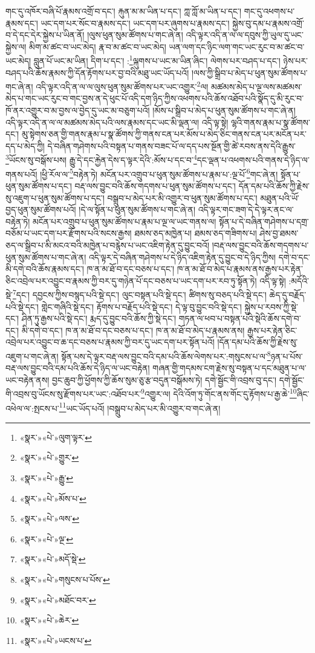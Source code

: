 གང་དུ་འཁོར་བཞི་པོ་རྣམས་འགྲོ་བ་དང་། རྐུན་མ་མ་ཡིན་པ་དང་། ཀླ་ཀློ་མ་ཡིན་པ་དང་། གང་དུ་འཕགས་པ་རྣམས་དང་། ཡང་དག་པར་སོང་བ་རྣམས་དང་། ཡང་དག་པར་ཞུགས་པ་རྣམས་དང་། སྐྱེས་བུ་དམ་པ་རྣམས་འགྲོ་བ་དེ་དང་དེར་སྐྱེས་པ་ཡིན་ནོ། །ལུས་ཕུན་སུམ་ཚོགས་པ་གང་ཞེ་ན། འདི་ལྟར་འདི་ན་ལ་ལ་དབུས་ཀྱི་ཡུལ་དུ་ཡང་སྐྱེས་ལ། མིག་མ་ཚང་བ་ཡང་མེད། རྣ་བ་མ་ཚང་བ་ཡང་མེད། ཡན་ལག་དང་ཉིང་ལག་གང་ཡང་རུང་བ་མ་ཚང་བ་ཡང་མེད། བླུན་པོ་ཡང་མ་ཡིན། དིག་པ་དང་། :\footnote{«སྣར་»«པེ་»ལུག་ལྟར་}ལྐུགས་པ་ཡང་མ་ཡིན་ཞིང་། ལེགས་པར་བཤད་པ་དང་། ཉེས་པར་བཤད་པའི་ཆོས་རྣམས་ཀྱི་དོན་རྟོགས་པར་བྱ་བའི་མཐུ་ཡང་ཡོད་པའོ། །ལས་ཀྱི་སྒྲིབ་པ་མེད་པ་ཕུན་སུམ་ཚོགས་པ་གང་ཞེ་ན། འདི་ལྟར་འདི་ན་ལ་ལ་ལུས་ཕུན་སུམ་ཚོགས་པར་ཡང་འགྱུར་\footnote{«སྣར་»«པེ་»གྱུར་}ལ། མཚམས་མེད་པ་ལྔ་ལས་མཚམས་མེད་པ་གང་ཡང་རུང་བ་གང་བྱས་ན་དེ་ཕུང་པོ་འདི་དག་ཉིད་ཀྱིས་འཕགས་པའི་ཆོས་འཐོབ་པའི་སྣོད་དུ་མི་རུང་བ་ཁོ་ནར་འགྱུར་བ་མ་བྱས་ལ་བྱེད་དུ་ཡང་མ་བཅུག་པའོ། །མོས་པ་སྒྲིབ་པ་མེད་པ་ཕུན་སུམ་ཚོགས་པ་གང་ཞེ་ན། འདི་ལྟར་འདི་ན་ལ་ལ་མཚམས་མེད་པའི་ལས་རྣམས་དང་ཡང་མི་ལྡན་ལ། འདི་ལྟ་སྟེ། ལྷའི་གནས་རྣམ་པ་སྣ་ཚོགས་དང་། མུ་སྟེགས་ཅན་གྱི་གནས་རྣམ་པ་སྣ་ཚོགས་ཀྱི་གནས་ངན་པར་མོས་པ་མེད་ཅིང་གནས་ངན་པར་མངོན་པར་དད་པ་མེད་ཀྱི། དེ་བཞིན་གཤེགས་པའི་བསྟན་པ་གནས་བཟང་པོ་ལ་དད་པས་སྔོན་གྱི་ཚེ་རབས་ནས་དེའི་རྒྱུས་\footnote{«སྣར་»«པེ་»རྒྱུ་}ཡོངས་སུ་བསྒོས་པས། རྒྱུ་དེ་དང་རྐྱེན་དེས་ད་ལྟར་དེའི་:མོས་པ་དང་བ་\footnote{«སྣར་»«པེ་»མོས་པ་}དང་ལྡན་པ་འཕགས་པའི་གནས་དེ་ཉིད་ལ་གནས་པའོ། །ཕྱི་རོལ་ལ་\footnote{«སྣར་»«པེ་»ལས་}བརྟེན་ཏེ། མངོན་པར་འགྲུབ་པ་ཕུན་སུམ་ཚོགས་པ་རྣམ་པ་:ལྔ་པོ་\footnote{«སྣར་»«པེ་»ལྔ་}གང་ཞེ་ན། སྟོན་པ་ཕུན་སུམ་ཚོགས་པ་དང་། བརྡ་ལས་བྱུང་བའི་ཆོས་གདགས་པ་ཕུན་སུམ་ཚོགས་པ་དང་། དོན་དམ་པའི་ཆོས་ཀྱི་རྗེས་སུ་འཇུག་པ་ཕུན་སུམ་ཚོགས་པ་དང་། བསྒྲུབ་པ་མེད་པར་མི་འགྱུར་བ་ཕུན་སུམ་ཚོགས་པ་དང་། མཐུན་པའི་ཡོ་བྱད་ཕུན་སུམ་ཚོགས་པའོ། །དེ་ལ་སྟོན་པ་ཕུན་སུམ་ཚོགས་པ་གང་ཞེ་ན། འདི་ལྟར་གང་ཟག་དེ་དེ་ལྟར་ནང་ལ་བརྟེན་ཏེ། མངོན་པར་འགྲུབ་པ་ཕུན་སུམ་ཚོགས་པ་རྣམ་པ་ལྔ་ལ་ཡང་གནས་ལ། སྟོན་པ་དེ་བཞིན་གཤེགས་པ་དགྲ་བཅོམ་པ་ཡང་དག་པར་རྫོགས་པའི་སངས་རྒྱས། ཐམས་ཅད་མཁྱེན་པ། ཐམས་ཅད་གཟིགས་པ། ཤེས་བྱ་ཐམས་ཅད་ལ་སྒྲིབ་པ་མི་མངའ་བའི་མཁྱེན་པ་བརྙེས་པ་ཡང་འཇིག་རྟེན་དུ་བྱུང་བའོ། །བརྡ་ལས་བྱུང་བའི་ཆོས་གདགས་པ་ཕུན་སུམ་ཚོགས་པ་གང་ཞེ་ན། འདི་ལྟར་དེ་བཞིན་གཤེགས་པ་དེ་ཉིད་འཇིག་རྟེན་དུ་བྱུང་བ་དེ་ཉིད་ཀྱིས། དགེ་བ་དང་མི་དགེ་བའི་ཆོས་རྣམས་དང་། ཁ་ན་མ་ཐོ་བ་དང་བཅས་པ་དང་། ཁ་ན་མ་ཐོ་བ་མེད་པ་རྣམས་ནས་རྒྱས་པར་རྟེན་ཅིང་འབྲེལ་པར་འབྱུང་བ་རྣམས་ཀྱི་བར་དུ་གཉེན་པོ་དང་བཅས་པ་ཡང་དག་པར་རབ་ཏུ་སྟོན་ཏེ། འདི་ལྟ་སྟེ། :མདོའི་སྡེ་\footnote{«སྣར་»«པེ་»མདོ་སྡེ་}དང་། དབྱངས་ཀྱིས་བསྙད་པའི་སྡེ་དང་། ལུང་བསྟན་པའི་སྡེ་དང་། ཚིགས་སུ་བཅད་པའི་སྡེ་དང་། ཆེད་དུ་བརྗོད་པའི་སྡེ་དང་། གླེང་གཞིའི་སྡེ་དང་། རྟོགས་པ་བརྗོད་པའི་སྡེ་དང་། དེ་ལྟ་བུ་བྱུང་བའི་སྡེ་དང་། སྐྱེས་པ་རབས་ཀྱི་སྡེ་དང་། ཤིན་ཏུ་རྒྱས་པའི་སྡེ་དང་། རྨད་དུ་བྱུང་བའི་ཆོས་ཀྱི་སྡེ་དང་། གཏན་ལ་ཕབ་པ་བསྟན་པའི་སྡེའི་ཆོས་དགེ་བ་དང་། མི་དགེ་བ་དང་། ཁ་ན་མ་ཐོ་བ་དང་བཅས་པ་དང་། ཁ་ན་མ་ཐོ་བ་མེད་པ་རྣམས་ནས། རྒྱས་པར་རྟེན་ཅིང་འབྲེལ་པར་འབྱུང་བ་ཆ་དང་བཅས་པ་རྣམས་ཀྱི་བར་དུ་ཡང་དག་པར་སྟོན་པའོ། །དོན་དམ་པའི་ཆོས་ཀྱི་རྗེས་སུ་འཇུག་པ་གང་ཞེ་ན། སྟོན་པས་དེ་ལྟར་བརྡ་ལས་བྱུང་བའི་དམ་པའི་ཆོས་ལེགས་པར་:གསུངས་པ་ལ་\footnote{«སྣར་»«པེ་»གསུངས་པ་པོས་}ཉན་པ་པོས་བརྡ་ལས་བྱུང་བའི་དམ་པའི་ཆོས་དེ་ཉིད་ལ་ཡང་བརྟེན། གཞན་གྱི་གདམས་ངག་རྗེས་སུ་བསྟན་པ་དང་མཐུན་པ་ལ་ཡང་བརྟེན་ནས། བྱང་ཆུབ་ཀྱི་ཕྱོགས་ཀྱི་ཆོས་སུམ་ཅུ་རྩ་བདུན་བསྒོམས་ཏེ། དགེ་སྦྱོང་གི་འབྲས་བུ་དང་། དགེ་སྦྱོང་གི་འབྲས་བུ་ཡོངས་སུ་རྫོགས་པར་ཡང་:འཐོབ་པར་\footnote{«སྣར་»«པེ་»མཐོང་བར་}འགྱུར་ལ། དེའི་འོག་ཏུ་གོང་ནས་གོང་དུ་རྟོགས་པ་རྒྱ་ཆེ་\footnote{«སྣར་»«པེ་»ཆེར་}ཞིང་འཕེལ་ལ་:སྤངས་པ་\footnote{«སྣར་»«པེ་»ཡངས་པ་}ཡང་ཡོད་པའོ། །བསྒྲུབ་པ་མེད་པར་མི་འགྱུར་བ་གང་ཞེ་ན། 